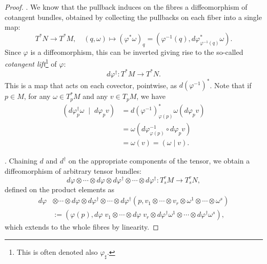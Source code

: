 \begin{proof}
	.
	We know that the pullback induces on the fibres a diffeomorphism of cotangent bundles, obtained by collecting the pullbacks on each fiber into a single map:
	\begin{equation}
		T^*N \to T^* M, \quad
		(q,\omega) \mapsto (\varphi^*\omega)_q = \left(\varphi^{-1}(q), d\varphi^*_{\varphi^{-1}(q)}\omega\right).
	\end{equation}
	Since $\varphi$ is a diffeomorphism, this can be inverted giving rise to the so-called \emph{cotangent lift}\footnote{This is often denoted also $\varphi_\sharp$.} of $\varphi$:
	\begin{equation}
		d\varphi^\dagger: T^*M \to T^*N.
	\end{equation}
	This is a map that acts on each covector, pointwise, as $d(\varphi^{-1})^*$.%
	Note that if $p\in M$, for any $\omega\in T_p^* M$ and any $v\in T_pM$, we have
	\begin{align}
		(d\varphi^\dagger_p \omega \;\mid\; d\varphi_p v)
		 & =  d(\varphi^{-1})^*_{\varphi(p)}\omega (d\varphi_p v) \\
		 & = \omega(d\varphi^{-1}_{\varphi(p)} \circ d\varphi_p v )                \\
		 & = \omega(v) = (\omega \mid v).
	\end{align}

	.
	Chaining $d$ and $d^\dagger$ on the appropriate components of the tensor, we obtain a diffeomorphism of arbitrary tensor bundles:
	\begin{equation}
		d\varphi \otimes\cdots\otimes d\varphi \otimes d\varphi^\dagger \otimes\cdots\otimes d\varphi^\dagger  : T_s^rM \to T_s^r N,
	\end{equation}
	defined on the product elements as
	\begin{align}
		d\varphi & \otimes\cdots\otimes d\varphi \otimes d\varphi^\dagger \otimes\cdots\otimes d\varphi^\dagger  (p, v_1 \otimes \cdots\otimes v_r \otimes \omega^1\otimes\cdots\otimes\omega^s) \\
		         & := (\varphi(p), d\varphi\; v_1 \otimes \cdots\otimes d\varphi\; v_r \otimes d\varphi^\dagger \omega^1\otimes\cdots\otimes d\varphi^\dagger \omega^s),
	\end{align}
	which extends to the whole fibres by linearity.
\end{proof}

